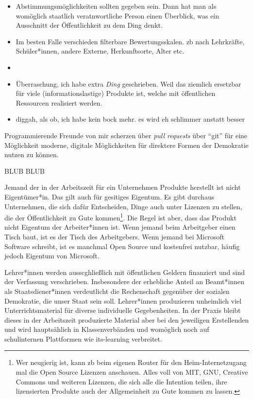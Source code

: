 \begin{itemize}
    \item Abstimmungsmöglichkeiten sollten gegeben sein. Dann hat man als womöglich staatlich veratnwortliche Person einen Überblick, was ein Ausschnitt der Öffentlichkeit zu dem Ding denkt.
    \item Im besten Falle verschieden filterbare Bewertungsskalen. \Gls{zb} nach Lehrkräfte, Schüler*innen, andere Externe, Herkunftsorte, Alter etc.
    \item 
    \item Überraschung, ich habe extra \emph{Ding} geschrieben. Weil das ziemlich ersetzbar für viele (informationslastige) Produkte ist, welche mit öffentlichen Ressourcen realisiert werden.
    \item diggah, als ob, ich habe kein bock mehr. es wird eh schlimmer anstatt besser
\end{itemize}


Programmierende Freunde von mir scherzen über \emph{pull requests} über \enquote{git} für eine Möglichkeit moderne, digitale Möglichkeiten für direktere Formen der Demokratie nutzen zu können.



BLUB BLUB

Jemand der in der Arbeitszeit für ein Unternehmen Produkte herstellt ist nicht Eigentümer*in. Das gilt auch für gesitiges Eigentum. Es gibt durchaus Unternehmen, die sich dafür Entscheiden, Dinge auch unter Lizenzen zu stellen, die der Öffentlichkeit zu Gute kommen\footnote{
    Wer neugierig ist, kann \gls{zb} beim eigenen Router für den Heim-Internetzugang mal die Open Source Lizenzen anschauen. Alles voll von MIT, GNU, Creative Commons und weiteren Lizenzen, die sich alle die Intention teilen, ihre lizensierten Produkte auch der Allgemeinheit zu Gute kommen zu lassen.
}. Die Regel ist aber, dass das Produkt nicht Eigentum der Arbeiter*innen ist. Wenn jemand beim Arbeitgeber einen Tisch baut, ist es der Tisch des Arbeitgebers. Wenn jemand bei Microsoft Software schreibt, ist es manchmal Open Source und kostenfrei nutzbar, häufig jedoch Eigentum von Microsoft.

Lehrer*innen werden ausscghließlich mit öffentlichen Geldern finanziert und sind der Verfassung verschrieben. Insbesondere der erhebliche Anteil an Beamt*innen als Staatsdiener*innen verdeutlicht die Rechenschaft gegenüber der sozialen Demokratie, die unser Staat sein soll. 
Lehrer*innen produzieren unheimlich viel Unterrichtsmaterial für diverse individuelle Gegebenheiten. In der Praxis bleibt dieses in der Arbeitszeit produzierte Material aber bei den jeweiligen Erstellenden und wird hauptsählich in Klassenverbänden und womöglich noch auf schulinternen Plattformen wie its-learning verbreitet. 

